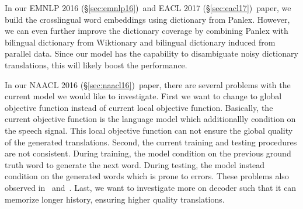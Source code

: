 \documentclass[12pt,twoside,final,hidelinks]{ltthesis}
\theoremstyle{definition}
\newcommand\naaclvi{NAACL 2016 (\S\ref{sec:naacl16})}
\newcommand\emnlpvi{EMNLP 2016 (\S\ref{sec:emnlp16})}
\newcommand\eaclvii{EACL 2017 (\S\ref{sec:eacl17})}
\begin{document}
In our \emnlpvi\ and \eaclvii\ paper, we build the crosslingual word embeddings using dictionary from Panlex. However, we can even further improve 
the dictionary coverage by combining Panlex with bilingual dictionary from Wiktionary and bilingual dictionary induced from parallel data. Since our model 
has the capability to disambiguate noisy dictionary translations, this will likely boost the performance. 

In our \naaclvi\ paper, there are several problems with the current model we would like to investigate. First we want to change to global objective function 
instead of current local objective function. Basically, the current objective function is the language model which additionallly condition on the speech signal. 
This local objective function can not ensure the global quality of the generated translations. Second, the current training and testing procedures are not consistent. During training, the model condition on the previous ground truth word to generate the next word. During testing, the model instead condition on the generated words which is prone to errors. These problems also observed in~ and~. Last, we want to investigate more on decoder such that it can memorize longer history, ensuring higher quality translations. 
\end{document}
